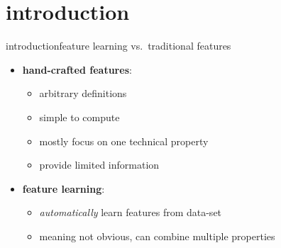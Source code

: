     \section[intro]{introduction}
        \begin{frame}{introduction}{feature learning vs.\ traditional features}
            \begin{itemize}
                \item   \textbf{hand-crafted features}:
                    \begin{itemize}
                        \item   arbitrary definitions
                        \item   simple to compute
                        \item   mostly focus on one technical property
                        \item   provide limited information
                    \end{itemize}
                    
                \bigskip
                \item<2-> \textbf{feature learning}:
                    \begin{itemize}
                        \item   \textit{automatically} learn features from data-set
                        \item   meaning not obvious, can combine multiple properties
                        
                    \end{itemize}
            \end{itemize}
        \end{frame}
        

